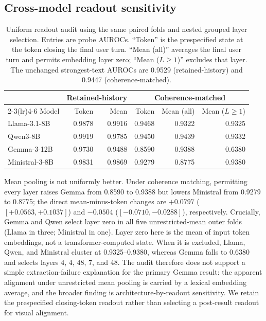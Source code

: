 \documentclass{article}
\begin{document}
\FloatBarrier
\subsection{Cross-model readout sensitivity}
\label{app:readout-sensitivity}

\begin{table}[h]
  \caption{Uniform readout audit using the same paired folds and nested grouped
  layer selection. Entries are probe AUROCs. ``Token'' is the prespecified state
  at the token closing the final user turn. ``Mean (all)'' averages the final
  user turn and permits embedding layer zero; ``Mean ($L\geq1$)'' excludes that
  layer. The unchanged strongest-text AUROCs are 0.9529 (retained-history) and
  0.9447 (coherence-matched).}
  \label{tab:appendix-readout}
  \centering
  \scriptsize
  \setlength{\tabcolsep}{2.8pt}
  \begin{tabular}{lrr@{\qquad}rrr}
    \toprule
      & \multicolumn{2}{c}{Retained-history} & \multicolumn{3}{c}{Coherence-matched} \\
    \cmidrule(lr){2-3}\cmidrule(lr){4-6}
    Model & Token & Mean & Token & Mean (all) & Mean ($L\geq1$) \\
    \midrule
    Llama-3.1-8B & 0.9878 & 0.9916 & 0.9468 & 0.9322 & 0.9325 \\
    Qwen3-8B & 0.9919 & 0.9785 & 0.9450 & 0.9439 & 0.9332 \\
    Gemma-3-12B & 0.9730 & 0.9488 & 0.8590 & 0.9388 & 0.6380 \\
    Ministral-3-8B & 0.9831 & 0.9869 & 0.9279 & 0.8775 & 0.9380 \\
    \bottomrule
  \end{tabular}
\end{table}

Mean pooling is not uniformly better. Under coherence matching, permitting every
layer raises Gemma from 0.8590 to 0.9388 but lowers Ministral from 0.9279 to
0.8775; the direct mean-minus-token changes are $+0.0797$
($[+0.0563,+0.1037]$) and $-0.0504$ ($[-0.0710,-0.0288]$), respectively.
Crucially, Gemma and Qwen select layer zero in all five unrestricted-mean outer
folds (Llama in three; Ministral in one). Layer zero here is the mean of input
token embeddings, not a transformer-computed state. When it is excluded,
Llama, Qwen, and Ministral cluster at 0.9325--0.9380, whereas Gemma falls to
0.6380 and selects layers 4, 4, 48, 7, and 48. The audit therefore does not
support a simple extraction-failure explanation for the primary Gemma result:
the apparent alignment under unrestricted mean pooling is carried by a lexical
embedding average, and the broader finding is architecture-by-readout
sensitivity. We retain the prespecified closing-token readout rather than
selecting a post-result readout for visual alignment.
\end{document}
